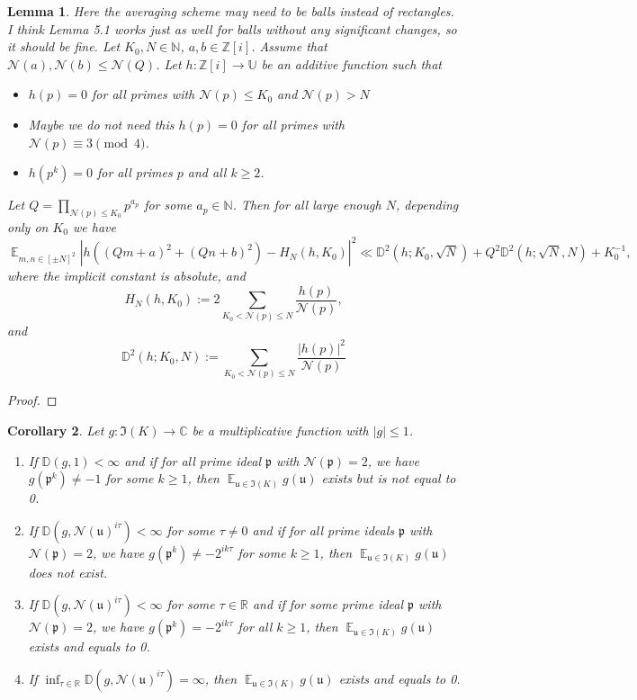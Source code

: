 \documentclass[11pt]{amsart}
\newtheorem{lemma}{Lemma}[section]
\newtheorem{corollary}[lemma]{Corollary}
\theoremstyle{definition}
\DeclareMathOperator*{\E}{\mathbb{E}}
\newcommand{\C}{{\mathbb C}}
\newcommand{\D}{{\mathbb D}}
\newcommand{\N}{{\mathbb N}}
\newcommand{\NN}{{\mathcal N}}
\newcommand{\R}{{\mathbb R}}
\newcommand{\Z}{{\mathbb Z}}
\newcommand{\U}{{\mathbb U}}
\begin{document}
\begin{lemma}\label{turankubsumsofsquares}
{\color{red} Here the averaging scheme may need to be balls instead of rectangles. I think Lemma 5.1 works just as well for balls without any significant changes, so it should be fine.}
Let $K_0, N \in \N$, $a, b \in\Z[i]$. Assume that $\NN(a), \NN(b) \leq \NN(Q)$.
Let $h: \Z[i] \to \U$ be an additive function such that
\begin{itemize}
    \item[(i)] $h(p)=0$ for all primes with $\NN(p) \leq K_0$ and $\NN(p) >N$
    \item[(ii)] {\color{red} Maybe we do not need this} $h(p)=0$ for all primes with $\NN(p) \equiv 3 \pmod 4$.
    \item[(iii)] $h(p^k)=0$ for all primes $p$ and all $k \geq 2$.
\end{itemize}
Let $Q=\prod_{ \NN(p) \leq K_0} p^{a_p}$ for some $a_p \in \N$. Then for all large enough $N$, depending only on $K_0$ we have
\[
\E_{m,n \in [\pm N]^2} |h((Qm+a)^2+(Qn+b)^2)-H_N(h,K_0)|^2 \ll \D^2(h; K_0, \sqrt{N})+Q^2\D^2(h; \sqrt{N},N)+K_0^{-1},
\]
where the implicit constant is absolute, and
\[
H_N(h,K_0):= 2\sum_{K_0 < \NN(p)\leq N} \frac{h(p)}{\NN(p)},
\]
and
\[
\D^2(h; K_0,N):=\sum_{K_0 <\NN(p) \leq N} \frac{|h(p)|^2}{\NN(p)}
\]
\end{lemma}
\begin{proof}

\end{proof}
\fi
\begin{corollary}\label{c27k}
     Let $g\colon\mathfrak{I}(K)\to\C$ be a multiplicative function with $\vert g\vert\leq 1$. 
     \begin{enumerate}
         \item If $\D(g,1)<\infty$ and if for all prime ideal $\mathfrak{p}$ with $\NN(\mathfrak{p})=2$, we have $g(\mathfrak{p}^{k})\neq -1$ for some $k\geq 1$,  then $\E_{\mathfrak{u}\in\mathfrak{I}(K)}g(\mathfrak{u})$ exists  but is not equal to 0.
         \item If $\D(g,\NN(\mathfrak{u})^{i\tau})<\infty$ for some $\tau\neq 0$ and if for all prime ideals $\mathfrak{p}$ with $\NN(\mathfrak{p})=2$, we have $g(\mathfrak{p}^{k})\neq -2^{ik\tau}$ for some $k\geq 1$, then $\E_{\mathfrak{u}\in\mathfrak{I}(K)}g(\mathfrak{u})$ does not exist.
         \item If $\D(g,\NN(\mathfrak{u})^{i\tau})<\infty$ for some $\tau\in\R$ and if for some prime ideal $\mathfrak{p}$ with $\NN(\mathfrak{p})=2$, we have $g(\mathfrak{p}^{k})=-2^{ik\tau}$ for all $k\geq 1$,  then $\E_{\mathfrak{u}\in\mathfrak{I}(K)}g(\mathfrak{u})$ exists and equals to 0.
         \item If $\inf_{\tau\in\R}\D(g,\NN(\mathfrak{u})^{i\tau})=\infty$, then $\E_{\mathfrak{u}\in\mathfrak{I}(K)}g(\mathfrak{u})$ exists and equals to 0.
     \end{enumerate}
\end{corollary}
\end{document}
